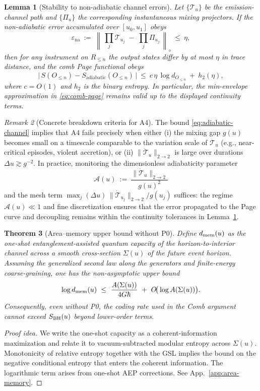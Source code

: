 \documentclass[11pt,a4paper]{article}
\theoremstyle{plain}
\newtheorem{theorem}{Theorem}
\newtheorem{lemma}[theorem]{Lemma}
\theoremstyle{definition}
\theoremstyle{remark}
\newtheorem{remark}[theorem]{Remark}
\begin{document}
\begin{lemma}[Stability to non-adiabatic channel errors]\label{lem:comb-stability}
Let $\{\mathcal{T}_u\}$ be the emission-channel path and $\{\Pi_u\}$ the corresponding instantaneous mixing projectors. If the non-adiabatic error accumulated over $[u_0,u_1]$ obeys
\[
\varepsilon_{\mathrm{na}} \ :=\ \left\|\,\prod_{j}\mathcal{T}_{u_j}\;-\;\prod_{j}\Pi_{u_j}\,\right\|_{\diamond}
\ \le\ \eta,
\]
then for any instrument on $R_{\le n}$ the output states differ by at most $\eta$ in trace distance, and the comb Page functional obeys
\[
\big|\,S(O_{\le n}) - S_{\mathrm{adiabatic}}(O_{\le n})\,\big| \ \le\ c\,\eta\,\log d_{O_{\le n}} \ +\ h_2(\eta),
\]
where $c=O(1)$ and $h_2$ is the binary entropy. In particular, the min-envelope approximation in \eqref{eq:comb-page} remains valid up to the displayed continuity terms.
\end{lemma}

\begin{remark}[Concrete breakdown criteria for A4]\label{rem:adiabatic-breakdown}
The bound \eqref{eq:adiabatic-channel} implies that A4 fails precisely when either (i) the mixing gap $g(u)$ becomes small on a timescale comparable to the variation scale of $\mathcal{T}_u$ (e.g., near-critical episodes, violent accretion), or (ii) $\|\dot{\mathcal{T}}_u\|_{2\to 2}$ is large over durations $\Delta u\gtrsim g^{-2}$. In practice, monitoring the dimensionless adiabaticity parameter
\[
\mathcal{A}(u)\ :=\ \frac{\|\dot{\mathcal{T}}_u\|_{2\to 2}}{g(u)^2}
\]
and the mesh term $\max_j (\Delta u)\,\|\dot{\mathcal{T}}_{u_j}\|_{2\to 2}/g(u_j)$ suffices: the regime $\mathcal{A}(u)\ll 1$ and fine discretization ensures that the error propagated to the Page curve and decoupling remains within the continuity tolerances in Lemma~\ref{lem:comb-stability}.
\end{remark}

\begin{theorem}[Area--memory upper bound without P0]\label{thm:area-memory-upper}
Define $d_{\rm mem}(u)$ as the one-shot entanglement-assisted quantum capacity of the horizon-to-interior channel across a smooth cross-section $\Sigma(u)$ of the future event horizon. Assuming the generalized second law along the generators and finite-energy coarse-graining, one has the non-asymptotic upper bound
\begin{equation}\label{eq:area-memory-upper}
\log d_{\rm mem}(u)\ \le\ \frac{A\!\left(\Sigma(u)\right)}{4G\hbar}\ +\ O\!\big(\log A(\Sigma(u))\big).
\end{equation}
Consequently, even without P0, the coding rate used in the Comb argument cannot exceed $S_{\rm BH}(u)$ beyond lower-order terms.
\end{theorem}
\begin{proof}[Proof idea]
We write the one-shot capacity as a coherent-information maximization and relate it to vacuum-subtracted modular entropy across $\Sigma(u)$. Monotonicity of relative entropy together with the GSL implies the bound on the negative conditional entropy that enters the coherent information. The logarithmic term arises from one-shot AEP corrections. See App.~\ref{app:area-memory}.
\end{proof}
\end{document}
